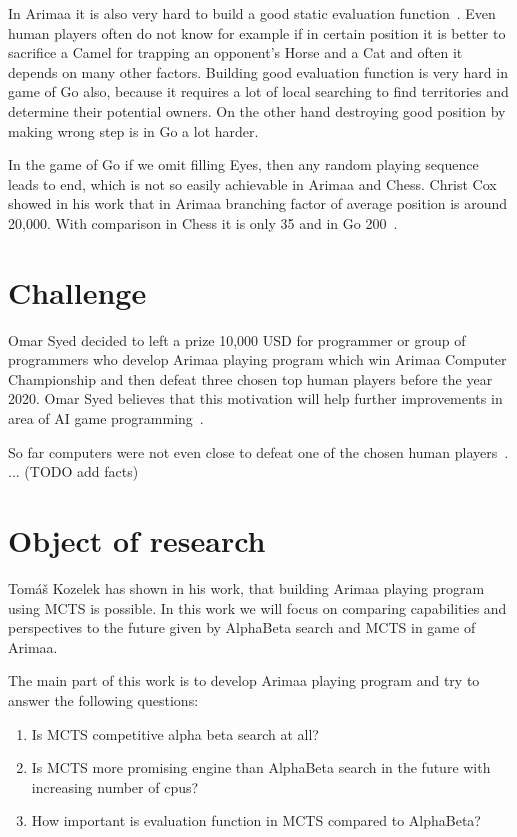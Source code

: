 In Arimaa it is also very hard to build a good static evaluation
function~\cite{WorldChampion}. Even human players often do not know for example
if in certain position it is better to sacrifice a Camel for trapping an
opponent's Horse and a Cat and often it depends on many other factors. Building
good evaluation function is very hard in game of Go also, because it requires a
lot of local searching to find territories and determine their potential
owners. On the other hand destroying good position by making wrong step is in
Go a lot harder.

In the game of Go if we omit filling \acsp{Eye}, then any random playing sequence
leads to end, which is not so easily achievable in Arimaa and Chess. Christ Cox
showed in his work that in Arimaa branching factor of average position is
around 20,000. With comparison in Chess it is only 35 and in Go 200~\cite{COX}.


\section{Challenge}
Omar Syed decided to left a prize 10,000 USD for programmer or group of
programmers who develop Arimaa playing program which win Arimaa Computer
Championship and then defeat three chosen top human players before the year
2020. Omar Syed believes that this motivation will help further improvements in
area of AI game programming~\cite{syed}.

So far computers were not even close to defeat one of the chosen human
players~\cite{arimaa.com}. ... (TODO add facts)

\section{Object of research}
Tomáš Kozelek has shown in his work, that building Arimaa playing program using
MCTS is possible. In this work we will focus on comparing capabilities and
perspectives to the future given by AlphaBeta search and MCTS in game of
Arimaa.

The main part of this work is to develop Arimaa playing program and try to
answer the following questions:

\begin{enumerate}
\item Is MCTS competitive alpha beta search at all?
\item Is MCTS more promising engine than AlphaBeta search in the future with
      increasing number of cpus?
\item How important is evaluation function in MCTS compared to AlphaBeta?
\end{enumerate}
